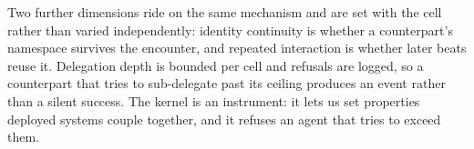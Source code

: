 Two further dimensions ride on the same mechanism and are set with the cell rather than
varied independently: identity continuity is whether a counterpart's namespace survives
the encounter, and repeated interaction is whether later beats reuse it. Delegation
depth is bounded per cell and refusals are logged, so a counterpart that tries to
sub-delegate past its ceiling produces an event rather than a silent success. The
kernel is an instrument: it lets us set properties deployed systems couple together,
and it refuses an agent that tries to exceed them.
